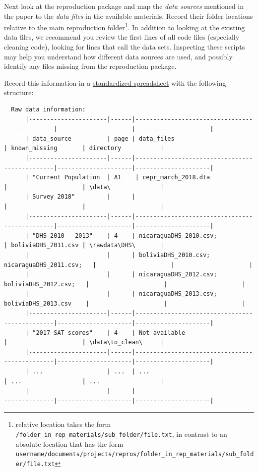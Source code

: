 \documentclass[]{book}
\begin{document}
Next look at the reproduction package and map the \emph{data sources} mentioned in the paper to the \emph{data files} in the available materials. Record their folder locations relative to the main reproduction folder\footnote{relative location takes the form \texttt{/folder\_in\_rep\_materials/sub\_folder/file.txt}, in contrast to an absolute location that has the form \texttt{username/documents/projects/repros/folder\_in\_rep\_materials/sub\_folder/file.txt}}. In addition to looking at the existing data files, we recommend you review the first lines of all code files (especially cleaning code), looking for lines that call the data sets. Inspecting these scripts may help you understand how different data sources are used, and possibly identify any files missing from the reproduction package.

Record this information in a \href{https://docs.google.com/spreadsheets/d/1LUIdVFH0OfR70C7z07TYeE-uWzKI_JIeWUMaYhqEKK0/edit\#gid=0\&range=A1}{standardized spreadsheet} with the following structure:

\begin{verbatim}
  Raw data information:
      |----------------------|------|-----------------------------------------------|---------------------|---------------------|
      | data_source          | page | data_files                                    | known_missing       | directory           |
      |----------------------|------|-----------------------------------------------|---------------------|---------------------|
      | "Current Population  | A1    | cepr_march_2018.dta                          |                     | \data\              |
      | Survey 2018"         |      |                                               |                     |                     |
      |----------------------|------|-----------------------------------------------|---------------------|---------------------|
      | "DHS 2010 - 2013"    | 4    | nicaraguaDHS_2010.csv;                        | boliviaDHS_2011.csv | \rawdata\DHS\       |
      |                      |      | boliviaDHS_2010.csv; nicaraguaDHS_2011.csv;   |                     |                     |
      |                      |      | nicaraguaDHS_2012.csv; boliviaDHS_2012.csv;   |                     |                     |
      |                      |      | nicaraguaDHS_2013.csv; boliviaDHS_2013.csv    |                     |                     |
      |----------------------|------|-----------------------------------------------|---------------------|---------------------|
      | "2017 SAT scores"    | 4    | Not available                                 |                     | \data\to_clean\     |
      |----------------------|------|-----------------------------------------------|---------------------|---------------------|
      | ...                  | ...  | ...                                           | ...                 | ...                 |
      |----------------------|------|-----------------------------------------------|---------------------|---------------------|
\end{verbatim}
\end{document}
